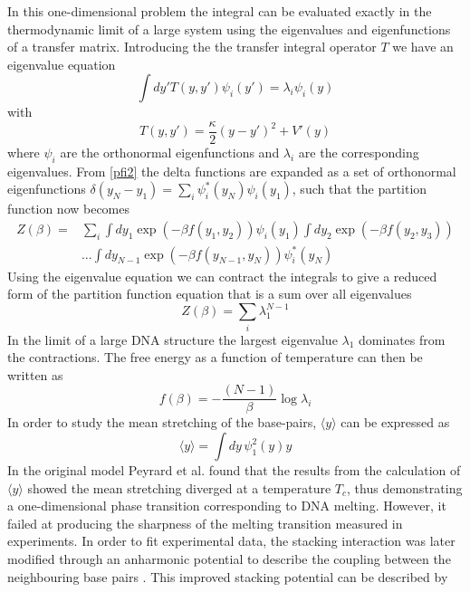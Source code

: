 %
In this one-dimensional problem the integral can be evaluated exactly in the thermodynamic limit of a large system using the eigenvalues and eigenfunctions of a transfer matrix. Introducing the the transfer integral operator $T$ we have an eigenvalue equation \cite{Peyrard1989a}
%
\begin{equation}
\int dy' T\left(y,y'\right)\psi_{i}\left(y'\right) =\lambda_{i}\psi_{i}\left(y\right)
\end{equation}
%
with
%
\begin{equation}
T\left(y,y'\right) = \frac{\kappa}{2}\left(y-y'\right)^{2} + V'\left(y\right)
\end{equation}
%
where $\psi_{i}$ are the orthonormal eigenfunctions and $\lambda_{i}$ are the corresponding eigenvalues. From \eqref{pfi2} the delta functions are expanded as a set of orthonormal eigenfunctions $\delta\left(y_{N}-y_{1}\right) = \sum_{i}\psi^{*}_{i}\left(y_{N}\right)\psi_{i}\left(y_{1}\right)$, such that the partition function now becomes
%
\begin{align}
Z\left(\beta\right)=& \sum_{i}\int dy_{1}\exp\left(-\beta f\left(y_1,y_2\right)\right)\psi_{i}\left(y_1\right)\int dy_{2}\exp\left(-\beta f\left(y_2,y_3\right)\right)\nonumber\\
&...\int dy_{N-1}\exp\left(-\beta f\left(y_{N-1},y_{N}\right)\right)\psi^{*}_{i}\left(y_N\right)
\label{pfi3}
\end{align}
%
Using the eigenvalue equation we can contract the integrals to give a reduced form of the partition function equation that is a sum over all eigenvalues \cite{Peyrard1989a}
%
\begin{equation}
Z\left(\beta\right)=\sum_{i}\lambda^{N-1}_{1}
\end{equation}
%
In the limit of a large DNA structure the largest eigenvalue $\lambda_{1}$ dominates from the contractions. The free energy as a function of temperature can then be written as
%
\begin{equation}
f\left(\beta\right)=-\frac{\left(N-1\right)}{\beta} \log \lambda_{i}
\end{equation}
%
In order to study the mean stretching of the base-pairs, $\langle y \rangle$ can be expressed as
%
\begin{equation}
\langle y \rangle = \int dy \,\psi^{2}_{1}\left(y\right) y 
\end{equation}
%
In the original model \cite{Peyrard1989a} Peyrard et al. found that the results from the calculation of $\langle y \rangle$ showed the mean stretching diverged at a temperature $T_c$, thus demonstrating a one-dimensional phase transition corresponding to DNA melting. However, it failed at producing the sharpness of the melting transition measured in experiments. In order to fit experimental data, the stacking interaction was later modified through an anharmonic potential to describe the coupling between the neighbouring base pairs \cite{Dauxois1993}. This improved stacking potential can be described by
